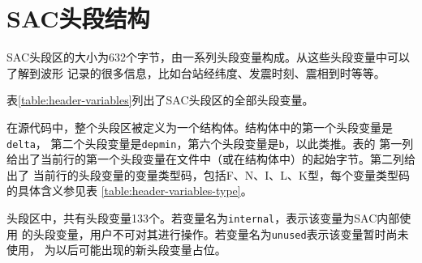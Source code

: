 \section{SAC头段结构}
SAC头段区的大小为632个字节，由一系列头段变量构成。从这些头段变量中可以了解到波形
记录的很多信息，比如台站经纬度、发震时刻、震相到时等等。

表\ref{table:header-variables}列出了SAC头段区的全部头段变量。

在源代码中，整个头段区被定义为一个结构体。结构体中的第一个头段变量是\lstinline{delta}，
第二个头段变量是\lstinline{depmin}，第六个头段变量是\lstinline{b}，以此类推。表的
第一列给出了当前行的第一个头段变量在文件中（或在结构体中）的起始字节。第二列给出了
当前行的头段变量的变量类型码，包括F、N、I、L、K型，每个变量类型码的具体含义参见表
\ref{table:header-variables-type}。

头段区中，共有头段变量133个。若变量名为\lstinline{internal}，表示该变量为SAC内部使用
的头段变量，用户不可对其进行操作。若变量名为\lstinline{unused}表示该变量暂时尚未使用，
为以后可能出现的新头段变量占位。

